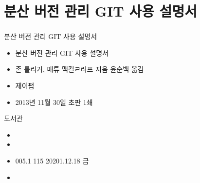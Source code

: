 \documentclass[aspectratio=1610,17pt,xcolor=pdftex,dvipsnames,table,handout]{beamer}
\begin{document}
		\section{분산 버전 관리 GIT 사용 설명서 }
		\begin{frame} [t,plain]
		\frametitle{}
			\begin{block}  {분산 버전 관리 GIT 사용 설명서 }
			\setlength{\leftmargini}{4em}			
			\begin{itemize}
				\item [제목]  	분산 버전 관리 GIT 사용 설명서 
				\item [지은이]	존 롤리거, 매튜 맥컬ㄹ러프 지음 윤순백 옮김
				\item [출판사]	제이펍 
				\item [출판일]	2013년 11월 30일  초판 1쇄
			\end{itemize}
			\end{block}						

			\begin{block}  {도서관}
			\setlength{\leftmargini}{4em}			
			\begin{itemize}
				\item [중앙]		
				\item [수정]		
				\item [부전]		005.1 115	20201.12.18 금
				\item [도서관]
			\end{itemize}
			\end{block}						
								
		\end{frame}						


\end{document}
